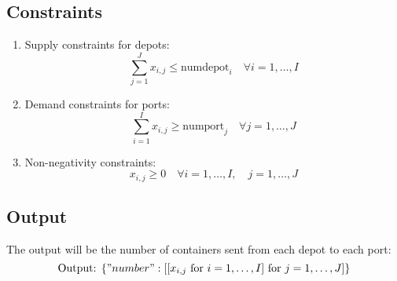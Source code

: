 \documentclass{article}
\begin{document}
\subsection*{Constraints}
\begin{enumerate}
    \item Supply constraints for depots:
    \[
    \sum_{j=1}^{J} x_{i,j} \leq \text{numdepot}_i \quad \forall i = 1, \ldots, I
    \]
    
    \item Demand constraints for ports:
    \[
    \sum_{i=1}^{I} x_{i,j} \geq \text{numport}_j \quad \forall j = 1, \ldots, J
    \]
    
    \item Non-negativity constraints:
    \[
    x_{i,j} \geq 0 \quad \forall i = 1, \ldots, I, \quad j = 1, \ldots, J
    \]
\end{enumerate}

\subsection*{Output}
The output will be the number of containers sent from each depot to each port:
\[
\text{Output: } \{ "number": [[x_{i,j} \text{ for } i = 1,\ldots,I] \text{ for } j = 1,\ldots,J] \} 
\]
\end{document}
